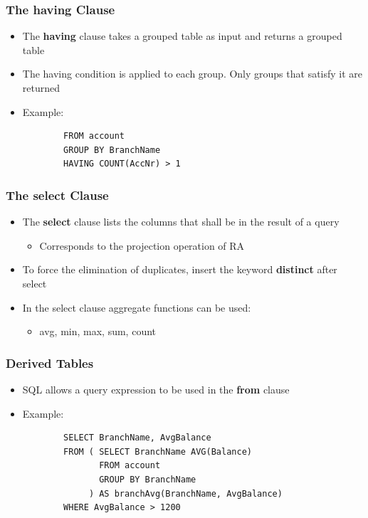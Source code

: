 \subsubsection{The having Clause}
\begin{itemize}[label=\(\rhd\)]
    \item The \textbf{having} clause takes a grouped table as input and returns a grouped table
    \item The having condition is applied to each group. Only groups that satisfy it are returned
    \item Example:
    \begin{lstlisting}
        FROM account
        GROUP BY BranchName
        HAVING COUNT(AccNr) > 1
    \end{lstlisting}
\end{itemize}

\subsubsection{The select Clause}
\begin{itemize}[label=\(\rhd\)]
    \item The \textbf{select} clause lists the columns that shall be in the result of a query
    \begin{itemize}[label=\(\rhd\)]
        \item Corresponds to the projection operation of RA
    \end{itemize}
    \item To force the elimination of duplicates, insert the keyword \textbf{distinct} after select
    \item In the select clause aggregate functions can be used:
    \begin{itemize}[label=\(\rhd\)]
        \item avg, min, max, sum, count
    \end{itemize}
\end{itemize}

\subsubsection{Derived Tables}
\begin{itemize}[label=\(\rhd\)]
    \item SQL allows a query expression to be used in the \textbf{from} clause
    \item Example:
    \begin{lstlisting}
        SELECT BranchName, AvgBalance
        FROM ( SELECT BranchName AVG(Balance)
               FROM account
               GROUP BY BranchName
             ) AS branchAvg(BranchName, AvgBalance)
        WHERE AvgBalance > 1200
    \end{lstlisting}
\end{itemize}

